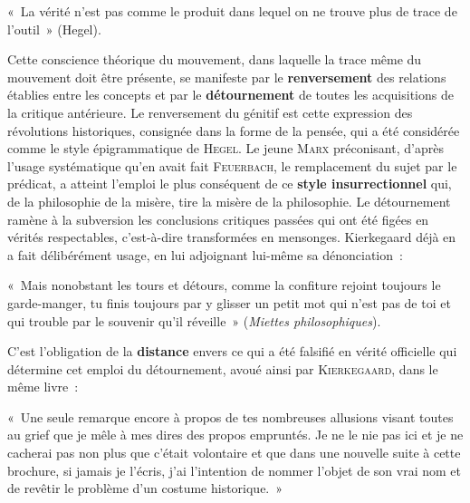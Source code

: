 \documentclass[french,twoside]{book} %
\newcommand\surname[1]{\textsc{#1}}
\newcommand\term[1]{\textbf{#1}}
\newenvironment{quoteblock}%
  {\begin{quoting}}
  {\end{quoting}}
\newenvironment{quotebar}{%
    \def\FrameCommand{{\color{rubric!10!}\vrule width 0.5em} \hspace{0.9em}}%
    \def\OuterFrameSep{0pt} %
    \MakeFramed {\advance\hsize-\width \FrameRestore}
  }%
  {%
    \endMakeFramed
  }
\renewenvironment{quoteblock}%
  {%
    \savenotes
    \setstretch{0.9}
    \begin{quotebar}
    \smallskip
  }
  {%
    \smallskip
    \end{quotebar}
    \spewnotes
  }
\begin{document}
\begin{quoteblock}
\noindent « La vérité n’est pas comme le produit dans lequel on ne trouve plus de trace de l’outil » (Hegel).\end{quoteblock}

\noindent Cette conscience théorique du mouvement, dans laquelle la trace même du mouvement doit être présente, se manifeste par le \term{renversement} des relations établies entre les concepts et par le \term{détournement} de toutes les acquisitions de la critique antérieure. Le renversement du génitif est cette expression des révolutions historiques, consignée dans la forme de la pensée, qui a été considérée comme le style épigrammatique de \surname{Hegel}. Le jeune \surname{Marx} préconisant, d’après l’usage systématique qu’en avait fait \surname{Feuerbach}, le remplacement du sujet par le prédicat, a atteint l’emploi le plus conséquent de ce \term{style insurrectionnel} qui, de la philosophie de la misère, tire la misère de la philosophie. Le détournement ramène à la subversion les conclusions critiques passées qui ont été figées en vérités respectables, c’est-à-dire transformées en mensonges. Kierkegaard déjà en a fait délibérément usage, en lui adjoignant lui-même sa dénonciation :\par

\begin{quoteblock}
\noindent « Mais nonobstant les tours et détours, comme la confiture rejoint toujours le garde-manger, tu finis toujours par y glisser un petit mot qui n’est pas de toi et qui trouble par le souvenir qu’il réveille » (\emph{Miettes philosophiques}).\end{quoteblock}

\noindent C’est l’obligation de la \term{distance} envers ce qui a été falsifié en vérité officielle qui détermine cet emploi du détournement, avoué ainsi par \surname{Kierkegaard}, dans le même livre :\par

\begin{quoteblock}
\noindent « Une seule remarque encore à propos de tes nombreuses allusions visant toutes au grief que je mêle à mes dires des propos empruntés. Je ne le nie pas ici et je ne cacherai pas non plus que c’était volontaire et que dans une nouvelle suite à cette brochure, si jamais je l’écris, j’ai l’intention de nommer l’objet de son vrai nom et de revêtir le problème d’un costume historique. »\end{quoteblock}
\end{document}

